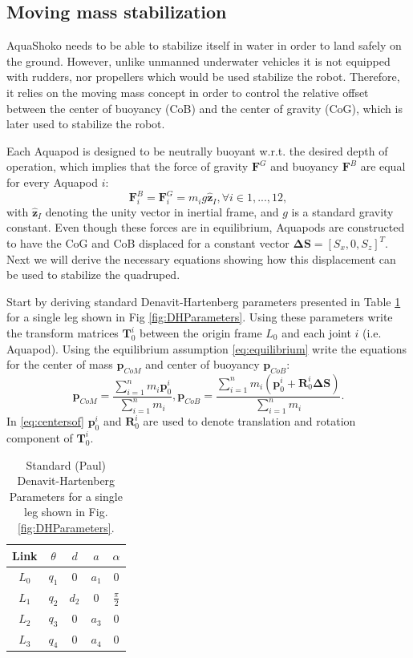 \subsection{Moving mass stabilization}
AquaShoko needs to be able to stabilize itself in water in order to land safely on the ground. However, unlike unmanned underwater vehicles it is not equipped with rudders, nor propellers which would be used stabilize the robot. Therefore, it relies on the moving mass concept in order to control the relative offset between the center of buoyancy (CoB) and the center of gravity (CoG), which is later used to stabilize the robot.

Each Aquapod is designed to be neutrally buoyant w.r.t. the desired depth of operation, which implies that the force of gravity $\textbf{F}^G$ and buoyancy $\textbf{F}^B$ are equal for every Aquapod $i$:
\begin{equation}\label{eq:equilibrium}
\textbf{F}^B_i=\textbf{F}^G_i=m_i g \hat{\textbf{z}}_I, \forall i \in 1,...,12,
\end{equation}
with $\hat{\textbf{z}}_I$ denoting the unity vector in inertial frame, and $g$ is a standard gravity constant. Even though these forces are in equilibrium, Aquapods are constructed to have the CoG and CoB displaced for a constant vector $\boldsymbol{\Delta}\textbf{S}=[S_x, 0, S_z]^T$. Next we will derive the necessary equations showing how this displacement can be used to stabilize the quadruped.

Start by deriving standard Denavit-Hartenberg parameters presented in Table \ref{tab:DHParameters} for a single leg shown in Fig \ref{fig:DHParameters}. Using these parameters write the transform matrices $\textbf{T}_0^i$ between the origin frame $L_0$ and each joint $i$ (i.e. Aquapod). Using the equilibrium assumption \eqref{eq:equilibrium} write the equations for the center of mass $\textbf{p}_{CoM}$ and center of buoyancy $\textbf{p}_{CoB}$:
\begin{equation}\label{eq:centersof}
\textbf{p}_{CoM} = \frac{\sum_{i=1}^n m_i \textbf{p}_0^i}{\sum_{i=1}^n m_i},\textbf{p}_{CoB} = \frac{\sum_{i=1}^n m_i( \textbf{p}_0^i+\textbf{R}_0^i \boldsymbol{\Delta}\textbf{S})}{\sum_{i=1}^n m_i}.
\end{equation} 
In \eqref{eq:centersof}  $\textbf{p}_0^i$ and $\textbf{R}_0^i$ are used to denote translation and rotation component of $\textbf{T}_0^i$.

\begin{table}[!t]
	\centering
	\caption{{Standard (Paul)} Denavit-Hartenberg Parameters for a single leg shown in Fig. \ref{fig:DHParameters}.}\label{tab:DHParameters}
	\begin{tabular}{ccccc}
		Link & $\theta$ & $d$ & $a$ & $\alpha$ \\\hline
		$L_0$ & $q_1$ & $0$ & $a_1$ & $0$\\
		$L_1$ & $q_2$ & $d_2$ & $0$ & $\frac{\pi}{2}$\\
		$L_2$ & $q_3$ & $0$ & $a_3$ & $0$\\
		$L_3$ & $q_4$ & $0$ & $a_4$ & $0$
	\end{tabular}
\end{table}

